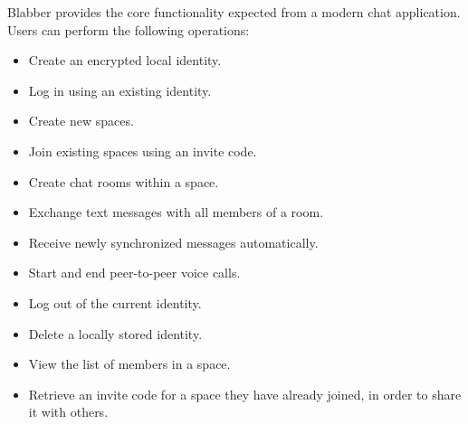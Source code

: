 \documentclass{article} %
\begin{document}
Blabber provides the core functionality expected from a modern chat application.
Users can perform the following operations:

\begin{itemize}
    \item Create an encrypted local identity.
    \item Log in using an existing identity.
    \item Create new spaces.
    \item Join existing spaces using an invite code.
    \item Create chat rooms within a space.
    \item Exchange text messages with all members of a room.
    \item Receive newly synchronized messages automatically.
    \item Start and end peer-to-peer voice calls.
    \item Log out of the current identity.
    \item Delete a locally stored identity.
    \item View the list of members in a space. %
    \item Retrieve an invite code for a space they have already joined, in order to share it with others.
\end{itemize}
\end{document}
